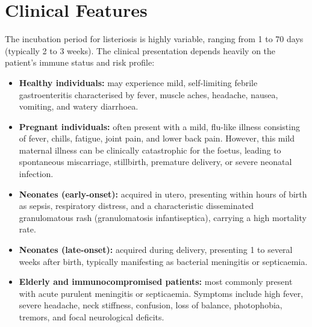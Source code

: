 \section*{Clinical Features}
The incubation period for listeriosis is highly variable, ranging from 1 to 70 days (typically 2 to 3 weeks). The clinical presentation depends heavily on the patient's immune status and risk profile:
\begin{itemize}
    \item \textbf{Healthy individuals:} may experience mild, self-limiting febrile gastroenteritis characterised by fever, muscle aches, headache, nausea, vomiting, and watery diarrhoea.
    \item \textbf{Pregnant individuals:} often present with a mild, flu-like illness consisting of fever, chills, fatigue, joint pain, and lower back pain. However, this mild maternal illness can be clinically catastrophic for the foetus, leading to spontaneous miscarriage, stillbirth, premature delivery, or severe neonatal infection.
    \item \textbf{Neonates (early-onset):} acquired in utero, presenting within hours of birth as sepsis, respiratory distress, and a characteristic disseminated granulomatous rash (granulomatosis infantiseptica), carrying a high mortality rate.
    \item \textbf{Neonates (late-onset):} acquired during delivery, presenting 1 to several weeks after birth, typically manifesting as bacterial meningitis or septicaemia.
    \item \textbf{Elderly and immunocompromised patients:} most commonly present with acute purulent meningitis or septicaemia. Symptoms include high fever, severe headache, neck stiffness, confusion, loss of balance, photophobia, tremors, and focal neurological deficits.
\end{itemize}

